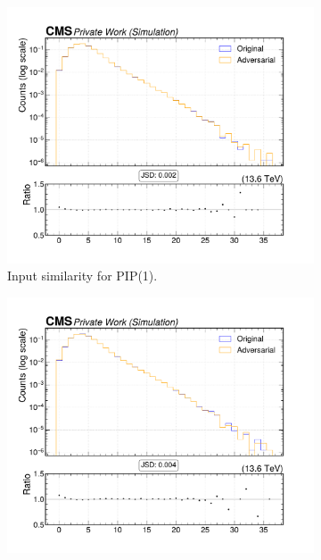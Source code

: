 \begin{figure}[htbp]
  \centering
  \begin{subfigure}[t]{0.32\textwidth}
    \includegraphics[width=\linewidth]{media/output/features/compare/intprob_1/cmp_global_features_TagVarCSV_jetNSelectedTracks.pdf}
    \caption{Input similarity for PIP(1).}
  \end{subfigure}\hfill
  \begin{subfigure}[t]{0.32\textwidth}
    \includegraphics[width=\linewidth]{media/output/features/compare/intprob_2/cmp_global_features_TagVarCSV_jetNSelectedTracks.pdf}

\end{subfigure}
\end{figure}
